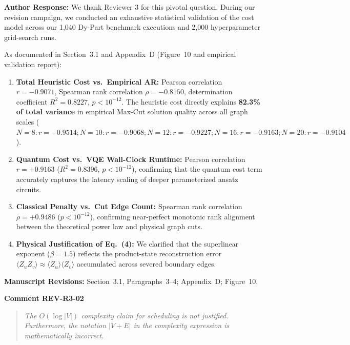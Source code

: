 \documentclass[11pt,a4paper]{article}
\newcommand{\commentbox}[2]{
    \vspace{0.8em}
    \noindent\textbf{\textcolor{commentcolor}{#1}}
    \vspace{0.2em}
    \begin{quote}
        \small\itshape #2
    \end{quote}
}
\newcommand{\responsebox}[1]{
    \noindent\textbf{\textcolor{responsecolor}{Author Response:}} #1
    \vspace{0.8em}
}
\begin{document}
\responsebox{We thank Reviewer 3 for this pivotal question. During our revision campaign, we conducted an exhaustive statistical validation of the cost model across our 1,040 Dy-Part benchmark executions and 2,000 hyperparameter grid-search runs.

As documented in Section~3.1 and Appendix~D (Figure~10 and empirical validation report):
\begin{enumerate}[noitemsep]
    \item \textbf{Total Heuristic Cost vs.\ Empirical AR:} Pearson correlation $r = -0.9071$, Spearman rank correlation $\rho = -0.8150$, determination coefficient $R^2 = 0.8227$, $p < 10^{-12}$. The heuristic cost directly explains \textbf{82.3\% of total variance} in empirical Max-Cut solution quality across all graph scales ($N=8: r=-0.9514; N=10: r=-0.9068; N=12: r=-0.9227; N=16: r=-0.9163; N=20: r=-0.9104$).
    \item \textbf{Quantum Cost vs.\ VQE Wall-Clock Runtime:} Pearson correlation $r = +0.9163$ ($R^2 = 0.8396$, $p < 10^{-12}$), confirming that the quantum cost term accurately captures the latency scaling of deeper parameterized ansatz circuits.
    \item \textbf{Classical Penalty vs.\ Cut Edge Count:} Spearman rank correlation $\rho = +0.9486$ ($p < 10^{-12}$), confirming near-perfect monotonic rank alignment between the theoretical power law and physical graph cuts.
    \item \textbf{Physical Justification of Eq.~(4):} We clarified that the superlinear exponent ($\beta = 1.5$) reflects the product-state reconstruction error $\langle Z_u Z_v \rangle \approx \langle Z_u \rangle \langle Z_v \rangle$ accumulated across severed boundary edges.
\end{enumerate}
\textbf{Manuscript Revisions:} Section~3.1, Paragraphs~3--4; Appendix~D; Figure~10.}

\commentbox{Comment REV-R3-02}{The $O(\log |V|)$ complexity claim for scheduling is not justified. Furthermore, the notation $|V+E|$ in the complexity expression is mathematically incorrect.}
\end{document}
